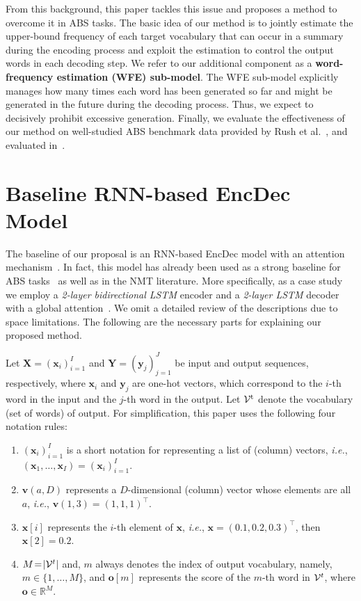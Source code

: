\documentclass[11pt]{article}
\begin{document}
 
   From this background, this paper tackles this issue and proposes a method to overcome it in ABS tasks.
The basic idea of our method is to jointly estimate the upper-bound frequency of each target vocabulary that can occur in a summary during the encoding process and exploit the estimation to control the output words in each decoding step.
We refer to our additional component as a {\bf word-frequency estimation (WFE) sub-model}.
The WFE sub-model explicitly manages how many times each word has been generated so far and might be generated in the future during the decoding process.
Thus, we expect to decisively prohibit excessive generation.
Finally, we evaluate the effectiveness of our method on well-studied ABS benchmark data provided by Rush et al.~, and evaluated in~\cite{chopra-auli-rush:2016:N16-1,nallapati-EtAl:2016:CoNLL,kikuchi-EtAl:2016:EMNLP2016,takase-EtAl:2016:EMNLP2016,DBLP:journals/corr/AyanaSLS16,gulcehre-EtAl:2016:P16-1}.


\section{Baseline RNN-based EncDec Model}
   The baseline of our proposal is an RNN-based EncDec model with an attention mechanism~\cite{luong-pham-manning:2015:EMNLP}.
In fact, this model has already been used as a strong baseline for ABS tasks~\cite{chopra-auli-rush:2016:N16-1,kikuchi-EtAl:2016:EMNLP2016} as well as in the NMT literature.
More specifically,  as a case study we employ a {\it 2-layer bidirectional LSTM} encoder and a {\it 2-layer LSTM} decoder with a global attention~\cite{DBLP:journals/corr/BahdanauCB14}.
We omit a detailed review of the descriptions due to space limitations.
The following are the necessary parts for explaining our proposed method.


   Let ${\bm X}\!=\!({\bm x}_i)^{I}_{i=1}$ and ${\bm Y}\!=\!({\bm y}_j)^{J}_{j=1}$ be input and output sequences, respectively, where ${\bm x}_i$ and ${\bm y}_j$ are one-hot vectors, which correspond to the $i$-th word in the input and the $j$-th word in the output.
Let ${\cal V}^{\rm t}$ denote the vocabulary (set of words) of output.
For simplification, this paper uses the following four notation rules:
   \begin{enumerate}
    \item $({\bm x}_i)^{I}_{i=1}$ is a short notation for representing a list of (column) vectors, {\it i.e.}, $({\bm x}_1,\dots, {\bm x}_I)=({\bm x}_i)^{I}_{i=1}$.
    \item $\bm{v}(a,D)$ represents a $D$-dimensional (column) vector whose elements are all $a$, {\it i.e.}, $\bm{v}(1,3)=(1, 1, 1)^{\top}$.
    \item $\bm{x}[i]$ represents the $i$-th element of $\bm{x}$, {\it i.e.}, $\bm{x}=(0.1, 0.2, 0.3)^{\top}$, then $\bm{x}[2]=0.2$.
    \item $M\!=\!|{\cal V}^{t}|$ and, $m$ always denotes the index of output vocabulary, namely, $m\in\{1,\dots,M\}$, and $\bm{o}[m]$ represents the score of the $m$-th word in ${\cal V}^{t}$, where $\bm{o}\in\mathbb{R}^{M}$.
   \end{enumerate}
   
\end{document}
